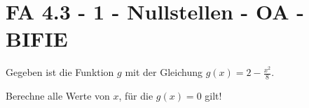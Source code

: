 \section{FA 4.3 - 1 - Nullstellen - OA - BIFIE}

\begin{beispiel}[FA 4.3]{1} %
				Gegeben ist die Funktion $g$ mit der Gleichung $g(x)=2-\frac{x^2}{8}$.

Berechne alle Werte von $x$, für die $g(x)=0$ gilt!

\end{beispiel}